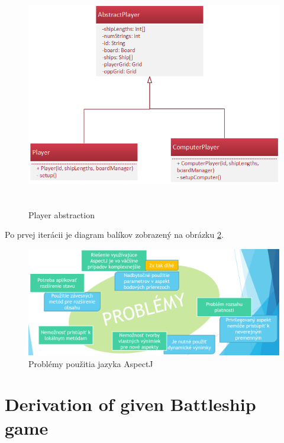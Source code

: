 \documentclass[11pt,slovak,a4paper,twoside]{article}
\begin{document}
\begin{figure}[H]  %
					\begin{center}
									\includegraphics[height=10cm]{fig/playerAbstraction.png}
									\caption{Player abstraction}
									\label{playerAbstraction}
					\end{center}
\end{figure}

Po prvej iterácii je diagram balíkov zobrazený na obrázku \ref{problemsOfAspectJ}.

\begin{figure}[H]  %
					\begin{center}
									\includegraphics[width=\linewidth]{fig/problemsOfAspectJ.png}
									\caption{Problémy použitia jazyka AspectJ}
									\label{problemsOfAspectJ}
					\end{center}
\end{figure}



\section{Derivation of given Battleship game} \label{gameDerivation}
\end{document}
